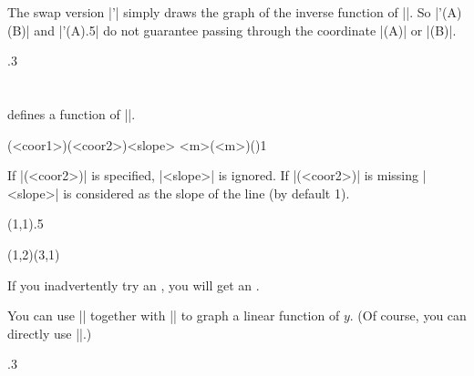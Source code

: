 \remark The swap version |\tzfn'| simply draws the graph of the inverse function of |\tzfn|.
So |\tzfn'(A)(B)| and |\tzfn'(A){.5}| do not guarantee passing through the coordinate |(A)| or |(B)|.

\begin{tzcode}{.3}
\end{tzcode}





\section{\protect\cmd{\tzdefLFnofy}}
\label{s:tzdefLFnofy}

\icmd{\tzdefLFnofy} defines a function of |\y|.

\begin{tzdef}{}
(<coor1>)(<coor2>){<slope>}
{<m>}(<m>)(){1}
\end{tzdef}

If |(<coor2>)| is specified, |{<slope>}| is ignored.
If |(<coor2>)| is missing |<slope>| is considered as the slope of the line (by default 1). 


\begin{tztikz}{}
\tzdefLFnofy\Fy(1,1){.5} %
  \def\Fy{.5*(\y-1)+1}
\end{tztikz}

\begin{tztikz}{}
\tzdefLFnofy\Gy(1,2)(3,1) %
  \def\Gy{-2*(\y-2)+1}
\end{tztikz}


\remark If you inadvertently try an , you will get an .

You can use |\tzdefLFnofy| together with |\tzFnofy| to graph a linear function of $y$.
(Of course, you can directly use |\tzLFnofy|.)


\begin{tzcode}{.3}
{}
\end{tzcode}

